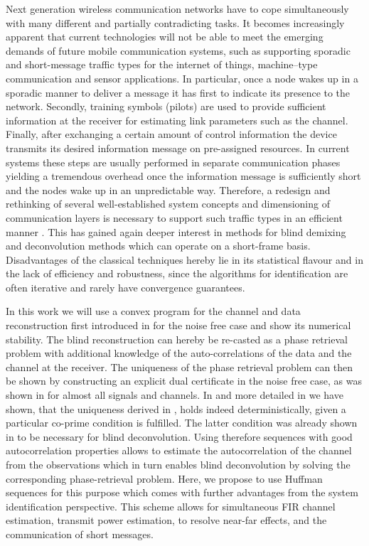 \documentclass[conference]{IEEEtran}
\begin{document}
Next generation wireless communication networks have to cope simultaneously with many different and partially
contradicting tasks. It becomes increasingly apparent that current technologies will not be able to meet the emerging
demands of future mobile communication systems, such as supporting sporadic and short-message traffic types for the
internet of things, machine--type communication and sensor applications.  In particular, once a node wakes up in a
sporadic manner to deliver a message it has first to indicate its presence to the network. Secondly, training symbols
(pilots) are used to provide sufficient information at the receiver for estimating link parameters such as the channel.
Finally, after exchanging a certain amount of control information the device transmits its desired information message
on pre-assigned resources. In current systems these steps are usually performed in separate communication phases
yielding a tremendous overhead once the information message is sufficiently short and the nodes wake up in an
unpredictable way.  Therefore, a redesign and rethinking of several well-established system concepts and dimensioning of
communication layers is necessary to support such traffic types in an efficient manner \cite{Wunder2015:sparse5G}.  This
has gained again deeper interest in methods for blind demixing and deconvolution methods which can operate on a
short-frame basis.  Disadvantages of the classical techniques hereby lie in its statistical flavour and in the lack of
efficiency and robustness, since the algorithms for identification are often iterative and rarely have convergence
guarantees.  

In this work we will use a convex program for the channel and data reconstruction first introduced in \cite{JH16} for
the noise free case and show its numerical stability. The blind reconstruction can hereby be re-casted as a phase
retrieval problem with additional knowledge of the auto-correlations of the data and the channel at the receiver.  The
uniqueness of the phase retrieval problem can then be shown by constructing an explicit dual certificate in the noise
free case, as was shown in \cite{JH16} for almost all signals and channels.  In \cite{WJPH16a} and more detailed in
\cite{WJPH17} we have shown, that the uniqueness derived in \cite{JH16}, holds indeed deterministically, given a
particular co-prime condition is fulfilled. The latter condition was already shown in \cite{XLTK95} to be necessary for
blind deconvolution. Using therefore sequences with good autocorrelation properties allows to estimate the
autocorrelation of the channel from the observations which in turn enables blind deconvolution by solving the
corresponding phase-retrieval problem.  Here, we propose to use Huffman sequences for this purpose which comes with
further advantages from the system identification perspective.  This scheme allows for simultaneous FIR channel
estimation, transmit power estimation, to resolve near-far effects, and the communication of short messages.
\end{document}
